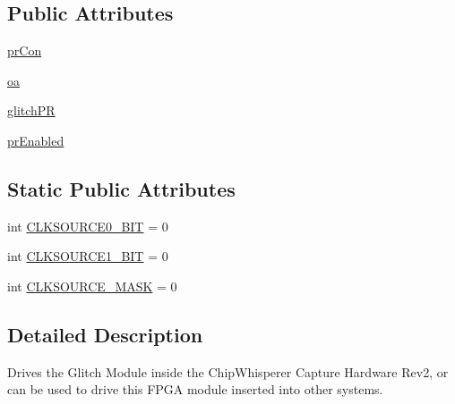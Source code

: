 \subsection*{Public Attributes}
\begin{DoxyCompactItemize}
\item 
\hyperlink{classsoftware_1_1chipwhisperer_1_1capture_1_1scopes_1_1cwhardware_1_1ChipWhispererGlitch_1_1ChipWhispererGlitch_aaf683c49a9113957348c91907b380381}{pr\+Con}
\item 
\hyperlink{classsoftware_1_1chipwhisperer_1_1capture_1_1scopes_1_1cwhardware_1_1ChipWhispererGlitch_1_1ChipWhispererGlitch_ad102fb22832ef3ea823622bc982d17f7}{oa}
\item 
\hyperlink{classsoftware_1_1chipwhisperer_1_1capture_1_1scopes_1_1cwhardware_1_1ChipWhispererGlitch_1_1ChipWhispererGlitch_a4eb93174ebf6845b1be3d4378afb212b}{glitch\+P\+R}
\item 
\hyperlink{classsoftware_1_1chipwhisperer_1_1capture_1_1scopes_1_1cwhardware_1_1ChipWhispererGlitch_1_1ChipWhispererGlitch_a2d60ad13214695175a589e57d09b34a6}{pr\+Enabled}
\end{DoxyCompactItemize}
\subsection*{Static Public Attributes}
\begin{DoxyCompactItemize}
\item 
int \hyperlink{classsoftware_1_1chipwhisperer_1_1capture_1_1scopes_1_1cwhardware_1_1ChipWhispererGlitch_1_1ChipWhispererGlitch_ab8393c842dbfc2961b6ea8703023cc5a}{C\+L\+K\+S\+O\+U\+R\+C\+E0\+\_\+\+B\+I\+T} = 0
\item 
int \hyperlink{classsoftware_1_1chipwhisperer_1_1capture_1_1scopes_1_1cwhardware_1_1ChipWhispererGlitch_1_1ChipWhispererGlitch_a3fab5fa61ea6f6afc76079633f1c74a3}{C\+L\+K\+S\+O\+U\+R\+C\+E1\+\_\+\+B\+I\+T} = 0
\item 
int \hyperlink{classsoftware_1_1chipwhisperer_1_1capture_1_1scopes_1_1cwhardware_1_1ChipWhispererGlitch_1_1ChipWhispererGlitch_a13a1956a55a2ab2f569d3004a8fb8d3c}{C\+L\+K\+S\+O\+U\+R\+C\+E\+\_\+\+M\+A\+S\+K} = 0
\end{DoxyCompactItemize}


\subsection{Detailed Description}
\begin{DoxyVerb}Drives the Glitch Module inside the ChipWhisperer Capture Hardware Rev2, or can be used to drive this FPGA module inserted into other systems.
\end{DoxyVerb}
 

